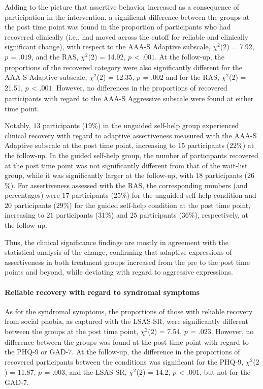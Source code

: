 \documentclass[3p]{elsarticle} %
\begin{document}
Adding to the picture that assertive behavior increased as a consequence
of participation in the intervention, a significant difference between
the groups at the post time point was found in the proportion of
participants who had recovered clinically (i.e., had moved across the
cutoff for reliable and clinically significant change), with respect to
the AAA-S Adaptive subscale, \(\chi^2\)(\(2\)) = 7.92, \(p_{ }\) =
\(.019\), and the RAS, \(\chi^2\)(\(2\)) = 14.92, \(p_{ }\) \textless{}
\(.001\). At the follow-up, the proportions of the recovered category
were also significantly different for the AAA-S Adaptive subscale,
\(\chi^2\)(\(2\)) = 12.35, \(p_{ }\) = \(.002\) and for the RAS,
\(\chi^2\)(\(2\)) = 21.51, \(p_{ }\) \textless{} \(.001\). However, no
differences in the proportions of recovered participants with regard to
the AAA-S Aggressive subscale were found at either time point.

Notably, \(13\) participants (\(19\)\%) in the unguided self-help group
experienced clinical recovery with regard to adaptive assertiveness
measured with the AAA-S Adaptive subscale at the post time point,
increasing to \(15\) participants (\(22\)\%) at the follow-up. In the
guided self-help group, the number of participants recovered at the post
time point was not significantly different from that of the wait-list
group, while it was significantly larger at the follow-up, with \(18\)
participants (\(26\)\%). For assertiveness assessed with the RAS, the
corresponding numbers (and percentages) were \(17\) participants
(\(25\)\%) for the unguided self-help condition and \(20\) participants
(\(29\)\%) for the guided self-help condition at the post time point,
increasing to \(21\) participants (\(31\)\%) and \(25\) participants
(\(36\)\%), respectively, at the follow-up.

Thus, the clinical significance findings are mostly in agreement with
the statistical analysis of the change, confirming that adaptive
expressions of assertiveness in both treatment groups increased from the
pre to the post time points and beyond, while deviating with regard to
aggressive expressions.

\hypertarget{reliable-recovery-with-regard-to-syndromal-symptoms}{%
\paragraph{Reliable recovery with regard to syndromal
symptoms}\label{reliable-recovery-with-regard-to-syndromal-symptoms}}

As for the syndromal symptoms, the proportions of those with reliable
recovery from social phobia, as captured with the LSAS-SR, were
significantly different between the groups at the post time point,
\(\chi^2\)(\(2\)) = 7.54, \(p_{ }\) = \(.023\). However, no difference
between the groups was found at the post time point with regard to the
PHQ-9 or GAD-7. At the follow-up, the difference in the proportions of
recovered participants between the conditions was significant for the
PHQ-9, \(\chi^2\)(\(2\)) = 11.87, \(p_{ }\) = \(.003\), and the LSAS-SR,
\(\chi^2\)(\(2\)) = 14.2, \(p_{ }\) \textless{} \(.001\), but not for
the GAD-7.
\end{document}
